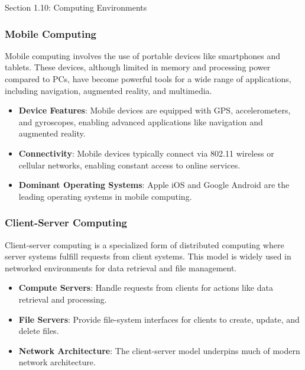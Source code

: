 \begin{notes}{Section 1.10: Computing Environments}
    \subsubsection*{Mobile Computing}
    
    Mobile computing involves the use of portable devices like smartphones and tablets. These devices, although limited in memory and processing power compared to PCs, have become powerful tools for 
    a wide range of applications, including navigation, augmented reality, and multimedia.
    
    \begin{highlight}
    
    \begin{itemize}
        \item \textbf{Device Features}: Mobile devices are equipped with GPS, accelerometers, and gyroscopes, enabling advanced applications like navigation and augmented reality.
        \item \textbf{Connectivity}: Mobile devices typically connect via 802.11 wireless or cellular networks, enabling constant access to online services.
        \item \textbf{Dominant Operating Systems}: Apple iOS and Google Android are the leading operating systems in mobile computing.
    \end{itemize}
    
    \end{highlight}
    
    \subsubsection*{Client-Server Computing}
    
    Client-server computing is a specialized form of distributed computing where server systems fulfill requests from client systems. This model is widely used in networked environments for data 
    retrieval and file management.
    
    \begin{highlight}
    
    \begin{itemize}
        \item \textbf{Compute Servers}: Handle requests from clients for actions like data retrieval and processing.
        \item \textbf{File Servers}: Provide file-system interfaces for clients to create, update, and delete files.
        \item \textbf{Network Architecture}: The client-server model underpins much of modern network architecture.
    \end{itemize}
    

\end{highlight}
\end{notes}
